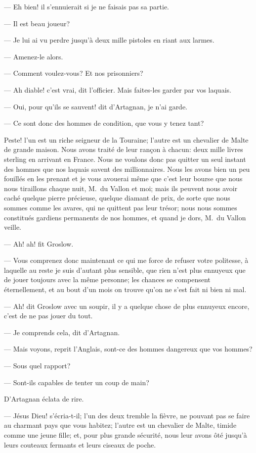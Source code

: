 — Eh bien! il s'ennuierait si je ne faisais pas sa partie.

— Il est beau joueur?

— Je lui ai vu perdre jusqu'à deux mille pistoles en riant aux larmes.

— Amenez-le alors.

— Comment voulez-vous? Et nos prisonniers?

— Ah diable! c'est vrai, dit l'officier. Mais faites-les garder par vos laquais.

— Oui, pour qu'ils se sauvent! dit d'Artagnan, je n'ai garde.

— Ce sont donc des hommes de condition, que vous y tenez tant?

Peste! l'un est un riche seigneur de la Touraine; l'autre est un chevalier de Malte de grande maison. Nous avons traité de leur rançon à chacun: deux mille livres sterling en arrivant en France. Nous ne voulons donc pas quitter un seul instant des hommes que nos laquais savent des millionnaires. Nous les avons bien un peu fouillés en les prenant et je vous avouerai même que c'est leur bourse que nous nous tiraillons chaque nuit, M.~du Vallon et moi; mais ils peuvent nous avoir caché quelque pierre précieuse, quelque diamant de prix, de sorte que nous sommes comme les avares, qui ne quittent pas leur trésor; nous nous sommes constitués gardiens permanents de nos hommes, et quand je dors, M.~du Vallon veille.

— Ah! ah! fit Groslow.

— Vous comprenez donc maintenant ce qui me force de refuser votre politesse, à laquelle au reste je suis d'autant plus sensible, que rien n'est plus ennuyeux que de jouer toujours avec la même personne; les chances se compensent éternellement, et au bout d'un mois on trouve qu'on ne s'est fait ni bien ni mal.

— Ah! dit Groslow avec un soupir, il y a quelque chose de plus ennuyeux encore, c'est de ne pas jouer du tout.

— Je comprends cela, dit d'Artagnan.

— Mais voyons, reprit l'Anglais, sont-ce des hommes dangereux que vos hommes?

— Sous quel rapport?

— Sont-ils capables de tenter un coup de main?

D'Artagnan éclata de rire.

— Jésus Dieu! s'écria-t-il; l'un des deux tremble la fièvre, ne pouvant pas se faire au charmant pays que vous habitez; l'autre est un chevalier de Malte, timide comme une jeune fille; et, pour plus grande sécurité, nous leur avons ôté jusqu'à leurs couteaux fermants et leurs ciseaux de poche.

